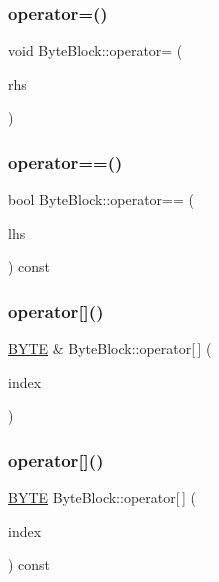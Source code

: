 \subsubsection{\texorpdfstring{operator=()}{operator=()}}
{\footnotesize\ttfamily void Byte\+Block\+::operator= (\begin{DoxyParamCaption}\item[{\hyperlink{class_byte_block}{Byte\+Block} \&\&}]{rhs }\end{DoxyParamCaption})}

\mbox{\label{class_byte_block_a08193b9eb12da9889420f95bee6ce610}} 
\subsubsection{\texorpdfstring{operator==()}{operator==()}}
{\footnotesize\ttfamily bool Byte\+Block\+::operator== (\begin{DoxyParamCaption}\item[{const \hyperlink{class_byte_block}{Byte\+Block} \&}]{lhs }\end{DoxyParamCaption}) const}

\mbox{\label{class_byte_block_a512ce89c574508343ed1c80c7422ae71}} 
\subsubsection{\texorpdfstring{operator[]()}{operator[]()}\hspace{0.1cm}{\footnotesize\ttfamily [1/2]}}
{\footnotesize\ttfamily \hyperlink{mycrypto_8hpp_a4ae1dab0fb4b072a66584546209e7d58}{B\+Y\+TE} \& Byte\+Block\+::operator\mbox{[}$\,$\mbox{]} (\begin{DoxyParamCaption}\item[{size\+\_\+t}]{index }\end{DoxyParamCaption})}

\mbox{\label{class_byte_block_a1188eeaf7da2316bdca468ea91727cd2}} 
\subsubsection{\texorpdfstring{operator[]()}{operator[]()}\hspace{0.1cm}{\footnotesize\ttfamily [2/2]}}
{\footnotesize\ttfamily \hyperlink{mycrypto_8hpp_a4ae1dab0fb4b072a66584546209e7d58}{B\+Y\+TE} Byte\+Block\+::operator\mbox{[}$\,$\mbox{]} (\begin{DoxyParamCaption}\item[{size\+\_\+t}]{index }\end{DoxyParamCaption}) const}

